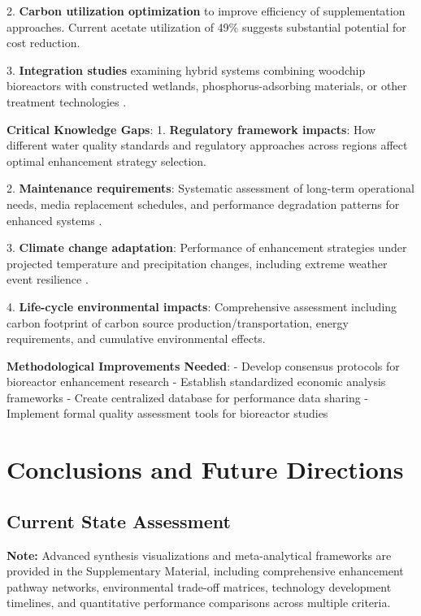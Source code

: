\documentclass[12pt,a4paper]{article}
\begin{document}
2. \textbf{Carbon utilization optimization} to improve efficiency of supplementation approaches. Current acetate utilization of 49\% \citep{RN196} suggests substantial potential for cost reduction.

3. \textbf{Integration studies} examining hybrid systems combining woodchip bioreactors with constructed wetlands, phosphorus-adsorbing materials, or other treatment technologies \citep{RN370, RN291}.

\textbf{Critical Knowledge Gaps}:
1. \textbf{Regulatory framework impacts}: How different water quality standards and regulatory approaches across regions affect optimal enhancement strategy selection.

2. \textbf{Maintenance requirements}: Systematic assessment of long-term operational needs, media replacement schedules, and performance degradation patterns for enhanced systems \citep{RN958}.

3. \textbf{Climate change adaptation}: Performance of enhancement strategies under projected temperature and precipitation changes, including extreme weather event resilience \citep{RN1181}.

4. \textbf{Life-cycle environmental impacts}: Comprehensive assessment including carbon footprint of carbon source production/transportation, energy requirements, and cumulative environmental effects.

\textbf{Methodological Improvements Needed}:
- Develop consensus protocols for bioreactor enhancement research
- Establish standardized economic analysis frameworks
- Create centralized database for performance data sharing
- Implement formal quality assessment tools for bioreactor studies

\section{Conclusions and Future Directions}

\subsection{Current State Assessment}

\textbf{Note:} Advanced synthesis visualizations and meta-analytical frameworks are provided in the Supplementary Material, including comprehensive enhancement pathway networks, environmental trade-off matrices, technology development timelines, and quantitative performance comparisons across multiple criteria.
\end{document}

